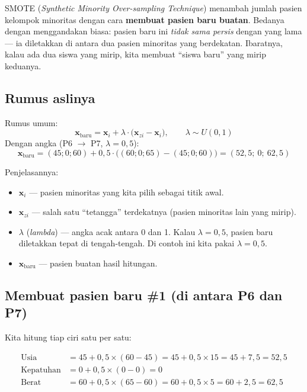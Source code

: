 \documentclass[11pt,a4paper]{article}
\begin{document}
SMOTE (\emph{Synthetic Minority Over-sampling Technique}) menambah jumlah pasien kelompok
minoritas dengan cara \textbf{membuat pasien baru buatan}. Bedanya dengan menggandakan biasa:
pasien baru ini \emph{tidak sama persis} dengan yang lama --- ia diletakkan di antara dua
pasien minoritas yang berdekatan. Ibaratnya, kalau ada dua siswa yang mirip, kita membuat
``siswa baru'' yang mirip keduanya.

\subsection{Rumus aslinya}

\begin{rumus}
Rumus umum:
\[ \mathbf{x}_{\text{baru}} = \mathbf{x}_i + \lambda \cdot \bigl(\mathbf{x}_{zi} - \mathbf{x}_i\bigr),
\qquad \lambda \sim U(0,1) \]
Dengan angka (P6 $\to$ P7, $\lambda = 0{,}5$):
\[ \mathbf{x}_{\text{baru}} = (45;0;60) + 0{,}5 \cdot \bigl((60;0;65) - (45;0;60)\bigr) = (52{,}5;\ 0;\ 62{,}5) \]
\end{rumus}

\noindent Penjelasannya:
\begin{itemize}[leftmargin=*]
  \item $\mathbf{x}_i$ --- pasien minoritas yang kita pilih sebagai titik awal.
  \item $\mathbf{x}_{zi}$ --- salah satu ``tetangga'' terdekatnya (pasien minoritas lain yang mirip).
  \item $\lambda$ (\emph{lambda}) --- angka acak antara 0 dan 1. Kalau $\lambda = 0{,}5$, pasien
        baru diletakkan tepat di tengah-tengah. Di contoh ini kita pakai $\lambda = 0{,}5$.
  \item $\mathbf{x}_{\text{baru}}$ --- pasien buatan hasil hitungan.
\end{itemize}

\subsection{Membuat pasien baru \#1 (di antara P6 dan P7)}

Kita hitung tiap ciri satu per satu:

\begin{align*}
\text{Usia}      &= 45 + 0{,}5 \times (60 - 45) = 45 + 0{,}5 \times 15 = 45 + 7{,}5 = 52{,}5 \\
\text{Kepatuhan} &= 0  + 0{,}5 \times (0 - 0)   = 0 \\
\text{Berat}     &= 60 + 0{,}5 \times (65 - 60) = 60 + 0{,}5 \times 5  = 60 + 2{,}5 = 62{,}5
\end{align*}
\end{document}
